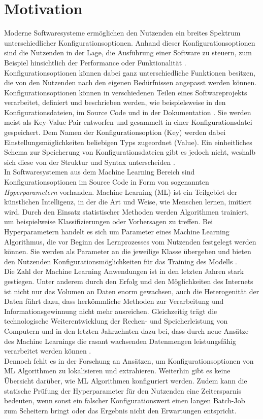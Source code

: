 \documentclass[german,bachelor]{swsLeipzig}
\begin{document}
\section{Motivation}
Moderne Softwaresysteme ermöglichen den Nutzenden ein breites Spektrum unterschiedlicher Konfigurationsoptionen.
Anhand dieser Konfigurationsoptionen sind die Nutzenden in der Lage, die Ausführung einer Software zu steuern, zum Beispiel
hinsichtlich der Performance oder Funktionalität \cite[]{10.1145/3427921.3450255}.
Konfigurationsoptionen können dabei ganz unterschiedliche Funktionen besitzen, die von den Nutzenden nach den eigenen Bedürfnissen angepasst werden können.\\
\indent Konfigurationsoptionen können in verschiedenen Teilen eines Softwareprojekts verarbeitet, definiert und beschrieben werden,
wie beispielsweise in den Konfigurationsdateien, im Source Code und in der Dokumentation \cite[]{7774519}.
Sie werden meist als Key-Value Pair entworfen und gesammelt in einer Konfigurationsdatei gespeichert.
Dem Namen der Konfigurationsoption (Key) werden dabei Einstellungsmöglichkeiten beliebigen Typs zugeordnet (Value).
Ein einheitliches Schema zur Speicherung von Konfigurationsdateien gibt es jedoch nicht, weshalb sich diese
von der Struktur und Syntax unterscheiden \cite[]{10.1145/1985793.1985812}.\\
\indent In Softwaresystemen aus dem Machine Learning Bereich sind Konfigurationsoptionen im Source Code
in Form von sogenannten \textit{Hyperparametern} vorhanden.
Machine Learning (ML) ist ein Teilgebiet der künstlichen Intelligenz, in der die Art und Weise, wie Menschen lernen,
imitiert wird.
Durch den Einsatz statistischer Methoden werden Algorithmen trainiert, um beispielweise Klassifizierungen oder Vorhersagen
zu treffen.
Bei Hyperparametern handelt es sich um Parameter eines Machine Learning Algorithmus,
die vor Beginn des Lernprozesses vom Nutzenden festgelegt werden können.
Sie werden als Parameter an die jeweilige Klasse übergeben und bieten den Nutzenden Konfigurationsmöglichkeiten für
das Training des Modells \cite[]{hype}.\\
\indent Die Zahl der Machine Learning Anwendungen ist in den letzten Jahren stark gestiegen.
Unter anderem durch den Erfolg und den Möglichkeiten des Internets ist nicht nur das Volumen an Daten enorm gewachsen,
auch die Heterogenität der Daten führt dazu, dass herkömmliche Methoden zur Verarbeitung
und Informationsgewinnung nicht mehr ausreichen.
Gleichzeitig trägt die technologische Weiterentwicklung der Rechen- und Speicherleistung von Computern und in den letzten Jahrzehnten dazu bei,
dass durch neue Ansätze des Machine Learnings die rasant wachsenden Datenmengen leistungsfähig verarbeitet werden können \cite[]{FRADKOV20201385}.\\
\indent Dennoch fehlt es in der Forschung an Ansätzen, um Konfigurationsoptionen von ML Algorithmen zu lokalisieren und extrahieren.
Weiterhin gibt es keine Übersicht darüber, wie ML Algorithmen konfiguriert werden.
Zudem kann die statische Prüfung der Hyperparameter für den Nutzenden eine Zeitersparnis bedeuten,
wenn sonst ein falscher Konfigurationswert einen langen Batch-Job zum Scheitern bringt
oder das Ergebnis nicht den Erwartungen entspricht. \\
\end{document}
